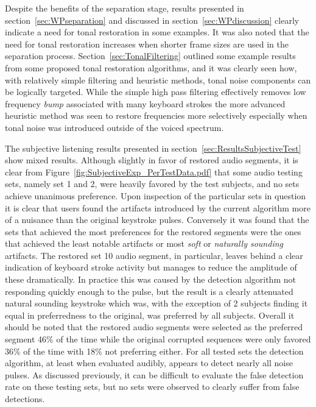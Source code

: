 Despite the benefits of the separation stage, results presented in section~\ref{sec:WPseparation} and discussed in section~\ref{sec:WPdiscussion} clearly indicate a need for tonal restoration in some examples. It was also noted that the need for tonal restoration increases when shorter frame sizes are used in the separation process. Section~\ref{sec:TonalFiltering} outlined some example results from some proposed tonal restoration algorithms, and it was clearly seen how, with relatively simple filtering and heuristic methods, tonal noise components can be logically targeted. While the simple high pass filtering effectively removes low frequency \emph{bump} associated with many keyboard strokes the more advanced heuristic method was seen to restore frequencies more selectively especially when tonal noise was introduced outside of the voiced spectrum.

The subjective listening results presented in section~\ref{sec:ResultsSubjectiveTest} show mixed results. Although slightly in favor of restored audio segments, it is clear from Figure~\ref{fig:SubjectiveExp_PerTestData.pdf} that some audio testing sets, namely set 1 and 2, were heavily favored by the test subjects, and no sets achieve unanimous preference. Upon inspection of the particular sets in question it is clear that users found the artifacts introduced by the current algorithm more of a nuisance than the original keystroke pulses. Conversely it was found that the sets that achieved the most preferences for the restored segments were the ones that achieved the least notable artifacts or most \emph{soft} or \emph{naturally sounding} artifacts. The restored set 10 audio segment, in particular, leaves behind a clear indication of keyboard stroke activity but manages to reduce the amplitude of these dramatically. In practice this was caused by the detection algorithm not responding quickly enough to the pulse, but the result is a clearly attenuated natural sounding keystroke which was, with the exception of 2 subjects finding it equal in preferredness to the original, was preferred by all subjects. Overall it should be noted that the restored audio segments were selected as the preferred segment 46\% of the time while the original corrupted sequences were only favored 36\% of the time with 18\% not preferring either. For all tested sets the detection algorithm, at least when evaluated audibly, appears to detect nearly all noise pulses. As discussed previously, it can be difficult to evaluate the false detection rate on these testing sets, but no sets were observed to clearly suffer from false detections.

